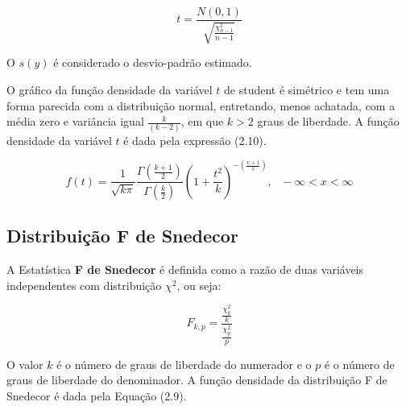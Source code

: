 \begin{equation}
    t =\frac{N(0,1)}{\sqrt{\frac{\chi^{2}_{n-1}}{n-1}}}
\end{equation}

O $s(y)$ é considerado o desvio-padrão estimado.\vskip0.3cm

O gráfico da função densidade da variável $t$ de student é simétrico e tem uma forma parecida com a distribuição normal, entretando, menos achatada, com a média zero e variância igual $\frac{k}{(k-2)}$, em que $k>2$ graus de liberdade. A função densidade da variável $t$ é dada pela expressão (2.10). 

\begin{equation}
f\left(t\right)=\frac{1}{\sqrt{k \pi}}\frac{\Gamma\left(\frac{k+1}{2}\right) }{\Gamma \left(\frac{k}{2}\right)}\left(1+\frac{t^2}{k}\right)^{-\left(\frac{\upsilon+1}{2}\right)},~~~-\infty<x<\infty
\end{equation}













\newpage
\subsection{Distribuição F de Snedecor}






A Estatística \textbf{F de Snedecor} é definida como a razão de duas variáveis independentes com distribuição $\chi^{2}$, ou seja:

\begin{equation}
    F_{k,p}=\frac{\frac{\chi^{2}_{k}}{k}}{\frac{\chi^{2}_{p}}{p}}
\end{equation}

O valor $k$ é o número de graus de liberdade do numerador e o $p$ é o número de graus de liberdade do denominador. A função densidade da distribuição F de Snedecor é dada pela Equação (2.9).


 